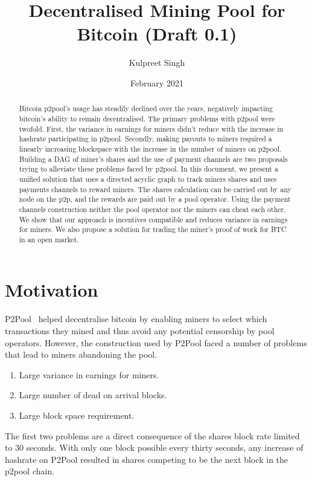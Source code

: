 \documentclass{article}
\title{Decentralised Mining Pool for Bitcoin (Draft 0.1)}
\author{Kulpreet Singh}
\date{February 2021}
\begin{document}
\maketitle

\begin{abstract}
  Bitcoin p2pool's usage has steadily declined over the years,
  negatively impacting bitcoin's ability to remain decentralised. The
  primary problems with p2pool were twofold. First, the variance in
  earnings for miners didn't reduce with the increase in hashrate
  participating in p2pool. Secondly, making payouts to miners required
  a linearly increasing blockspace with the increase in the number of
  miners on p2pool. Building a DAG of miner's shares and the use of
  payment channels are two proposals trying to alleviate these
  problems faced by p2pool. In this document, we present a unified
  solution that uses a directed acyclic graph to track miners shares
  and uses payments channels to reward miners. The shares calculation
  can be carried out by any node on the p2p, and the rewards are paid
  out by a pool operator. Using the payment channels construction
  neither the pool operator nor the miners can cheat each other. We
  show that our approach is incentives compatible and reduces variance
  in earnings for miners. We also propose a solution for trading the
  miner's proof of work for BTC in an open market.
\end{abstract}
   
\section{Motivation}

P2Pool~\cite{p2pool:wiki} helped decentralise bitcoin by enabling
miners to select which transactions they mined and thus avoid any
potential censorship by pool operators. However, the construction used
by P2Pool faced a number of problems that lead to miners abandoning
the pool.

\begin{enumerate}
  \item Large variance in earnings for miners.
  \item Large number of dead on arrival blocks.
  \item Large block space requirement.
\end{enumerate}

The first two problems are a direct consequence of the shares block
rate limited to 30 seconds. With only one block possible every thirty
seconds, any increase of hashrate on P2Pool resulted in shares
competing to be the next block in the p2pool chain.
\end{document}
